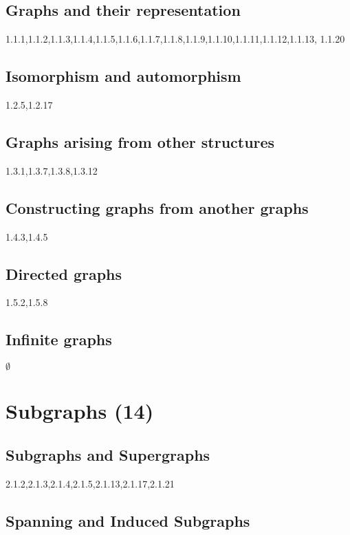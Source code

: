 \documentclass[12pt]{article}
\begin{document}
\subsection{Graphs and their representation}

1.1.1,1.1.2,1.1.3,1.1.4,1.1.5,1.1.6,1.1.7,1.1.8,1.1.9,1.1.10,1.1.11,1.1.12,1.1.13,
1.1.20

\subsection{Isomorphism and automorphism}

1.2.5,1.2.17

\subsection{Graphs arising from other structures}

1.3.1,1.3.7,1.3.8,1.3.12

\subsection{Constructing graphs from another graphs}

1.4.3,1.4.5

\subsection{Directed graphs}

1.5.2,1.5.8

\subsection{Infinite graphs}

$\emptyset$

\newpage

\section{Subgraphs (14)}

\subsection{Subgraphs and Supergraphs}

2.1.2,2.1.3,2.1.4,2.1.5,2.1.13,2.1.17,2.1.21

\subsection{Spanning and Induced Subgraphs}
\end{document}
